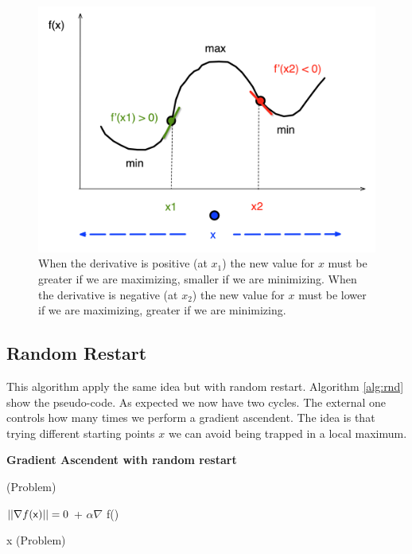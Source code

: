 \begin{figure}[!htbp] 
   \begin{center}
   \includegraphics[scale=0.5]{cap02/imagens/grad.png} 
   \caption{When the derivative is positive (at $x_1$) the new value for $x$ must be greater if we are maximizing, smaller if we are minimizing. When the derivative is negative (at $x_2$) the new value for $x$ must be lower if we are maximizing, greater if we are minimizing.}
   \label{fig:grad1}
   \end{center}
\end{figure}



\subsection{Random Restart} 

This algorithm apply the same idea but with random restart. Algorithm \ref{alg:rnd} show the pseudo-code. As expected we now have two cycles. The external one controls how many times we perform a gradient ascendent. The idea is that trying different starting points $x$ we can avoid being trapped in a local maximum. 



\begin{algorithm}

\caption{{\bf Gradient Ascendent with random restart\label{alg:rnd}}}
\BlankLine
{}
\BlankLine

 \Assign {}(Problem) \;
 \Assign {}

{
\Repeat 
	{ $|| \nabla f(\DataSty{x}) || = 0$} 
	{ \Assign  {} +  $\alpha \nabla$ f()}
	

x \Assign  {}(Problem)

}


\end{algorithm}


